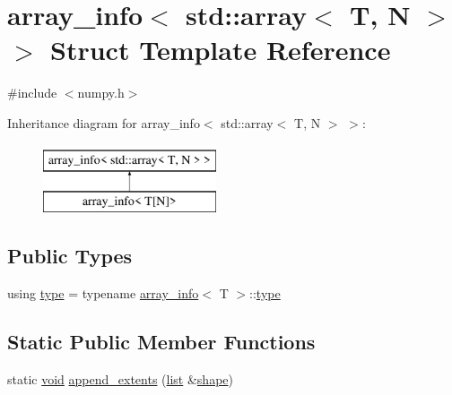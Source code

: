 \hypertarget{structarray__info_3_01std_1_1array_3_01_t_00_01_n_01_4_01_4}{}\section{array\+\_\+info$<$ std\+::array$<$ T, N $>$ $>$ Struct Template Reference}
\label{structarray__info_3_01std_1_1array_3_01_t_00_01_n_01_4_01_4}


{\ttfamily \#include $<$numpy.\+h$>$}

Inheritance diagram for array\+\_\+info$<$ std\+::array$<$ T, N $>$ $>$\+:\begin{figure}[H]
\begin{center}
\leavevmode
\includegraphics[height=2.000000cm]{structarray__info_3_01std_1_1array_3_01_t_00_01_n_01_4_01_4}
\end{center}
\end{figure}
\subsection*{Public Types}
\begin{DoxyCompactItemize}
\item 
using \mbox{\hyperlink{structarray__info_3_01std_1_1array_3_01_t_00_01_n_01_4_01_4_a0023c48fec7c0b11090f45b7ceb9a307}{type}} = typename \mbox{\hyperlink{structarray__info}{array\+\_\+info}}$<$ T $>$\+::\mbox{\hyperlink{structarray__info_3_01std_1_1array_3_01_t_00_01_n_01_4_01_4_a0023c48fec7c0b11090f45b7ceb9a307}{type}}
\end{DoxyCompactItemize}
\subsection*{Static Public Member Functions}
\begin{DoxyCompactItemize}
\item 
static \mbox{\hyperlink{_s_d_l__opengles2__gl2ext_8h_ae5d8fa23ad07c48bb609509eae494c95}{void}} \mbox{\hyperlink{structarray__info_3_01std_1_1array_3_01_t_00_01_n_01_4_01_4_ac08c22b2e5c8f93e9f4c971a9f71db16}{append\+\_\+extents}} (\mbox{\hyperlink{classlist}{list}} \&\mbox{\hyperlink{abstract_8h_aa30a150670a6aaebe0bf9bcf91b00b35}{shape}})
\end{DoxyCompactItemize}
